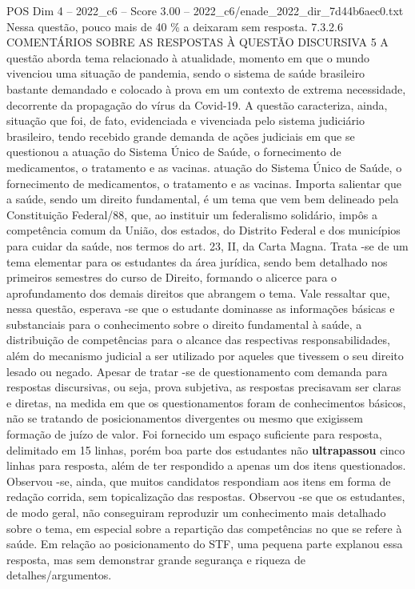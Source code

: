\begin{textsample}{POS Dim 4 – 2022\_c6 – Score 3.00 – 2022\_c6/enade\_2022\_dir\_7d44b6aec0.txt}
Nessa questão, pouco mais de 40 \% a deixaram sem resposta. 7.3.2.6 COMENTÁRIOS SOBRE AS RESPOSTAS À QUESTÃO DISCURSIVA 5 A questão aborda tema relacionado à atualidade, momento em que o mundo vivenciou uma situação de pandemia, sendo o sistema de saúde brasileiro bastante demandado e colocado à prova em um contexto de extrema necessidade, decorrente da propagação do vírus da Covid-19.
A questão caracteriza, ainda, situação que foi, de fato, evidenciada e vivenciada pelo sistema judiciário brasileiro, tendo recebido grande demanda de ações judiciais em que se questionou a atuação do Sistema Único de Saúde, o fornecimento de medicamentos, o tratamento e as vacinas. atuação do Sistema Único de Saúde, o fornecimento de medicamentos, o tratamento e as vacinas.
Importa salientar que a saúde, sendo um direito fundamental, é um tema que vem bem delineado pela Constituição Federal/88, que, ao instituir um federalismo solidário, impôs a competência comum da União, dos estados, do Distrito Federal e dos municípios para cuidar da saúde, nos termos do art. 23, II, da Carta Magna.
Trata -se de um tema elementar para os estudantes da área jurídica, sendo bem detalhado nos primeiros semestres do curso de Direito, formando o alicerce para o aprofundamento dos demais direitos que abrangem o tema.
Vale ressaltar que, nessa questão, esperava -se que o estudante dominasse as informações básicas e substanciais para o conhecimento sobre o direito fundamental à saúde, a distribuição de competências para o alcance das respectivas responsabilidades, além do mecanismo judicial a ser utilizado por aqueles que tivessem o seu direito lesado ou negado.
Apesar de tratar -se de questionamento com demanda para respostas discursivas, ou seja, prova subjetiva, as respostas precisavam ser claras e diretas, na medida em que os questionamentos foram de conhecimentos básicos, não se tratando de posicionamentos divergentes ou mesmo que exigissem formação de juízo de valor.
Foi fornecido um espaço suficiente para resposta, delimitado em 15 linhas, porém boa parte dos estudantes não \textbf{ultrapassou} cinco linhas para resposta, além de ter respondido a apenas um dos itens questionados.
Observou -se, ainda, que muitos candidatos respondiam aos itens em forma de redação corrida, sem topicalização das respostas.
Observou -se que os estudantes, de modo geral, não conseguiram reproduzir um conhecimento mais detalhado sobre o tema, em especial sobre a repartição das competências no que se refere à saúde.
Em relação ao posicionamento do STF, uma pequena parte explanou essa resposta, mas sem demonstrar grande segurança e riqueza de detalhes/argumentos.

\end{textsample}
